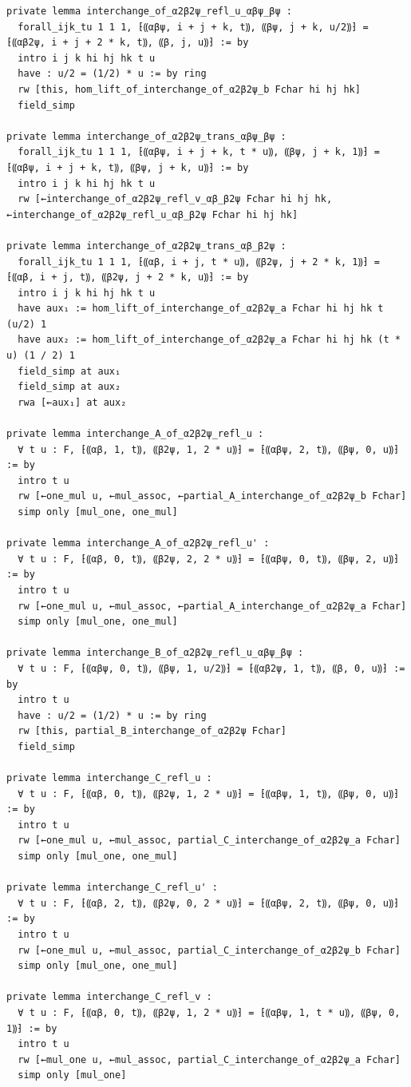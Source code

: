 \begin{Verbatim}
private lemma interchange_of_α2β2ψ_refl_u_αβψ_βψ :
  forall_ijk_tu 1 1 1, ⁅⸨αβψ, i + j + k, t⸩, ⸨βψ, j + k, u/2⸩⁆ = ⁅⸨αβ2ψ, i + j + 2 * k, t⸩, ⸨β, j, u⸩⁆ := by
  intro i j k hi hj hk t u
  have : u/2 = (1/2) * u := by ring
  rw [this, hom_lift_of_interchange_of_α2β2ψ_b Fchar hi hj hk]
  field_simp

private lemma interchange_of_α2β2ψ_trans_αβψ_βψ :
  forall_ijk_tu 1 1 1, ⁅⸨αβψ, i + j + k, t * u⸩, ⸨βψ, j + k, 1⸩⁆ = ⁅⸨αβψ, i + j + k, t⸩, ⸨βψ, j + k, u⸩⁆ := by
  intro i j k hi hj hk t u
  rw [←interchange_of_α2β2ψ_refl_v_αβ_β2ψ Fchar hi hj hk, ←interchange_of_α2β2ψ_refl_u_αβ_β2ψ Fchar hi hj hk]

private lemma interchange_of_α2β2ψ_trans_αβ_β2ψ :
  forall_ijk_tu 1 1 1, ⁅⸨αβ, i + j, t * u⸩, ⸨β2ψ, j + 2 * k, 1⸩⁆ = ⁅⸨αβ, i + j, t⸩, ⸨β2ψ, j + 2 * k, u⸩⁆ := by
  intro i j k hi hj hk t u
  have aux₁ := hom_lift_of_interchange_of_α2β2ψ_a Fchar hi hj hk t (u/2) 1
  have aux₂ := hom_lift_of_interchange_of_α2β2ψ_a Fchar hi hj hk (t * u) (1 / 2) 1
  field_simp at aux₁
  field_simp at aux₂
  rwa [←aux₁] at aux₂

private lemma interchange_A_of_α2β2ψ_refl_u :
  ∀ t u : F, ⁅⸨αβ, 1, t⸩, ⸨β2ψ, 1, 2 * u⸩⁆ = ⁅⸨αβψ, 2, t⸩, ⸨βψ, 0, u⸩⁆ := by
  intro t u
  rw [←one_mul u, ←mul_assoc, ←partial_A_interchange_of_α2β2ψ_b Fchar]
  simp only [mul_one, one_mul]

private lemma interchange_A_of_α2β2ψ_refl_u' :
  ∀ t u : F, ⁅⸨αβ, 0, t⸩, ⸨β2ψ, 2, 2 * u⸩⁆ = ⁅⸨αβψ, 0, t⸩, ⸨βψ, 2, u⸩⁆ := by
  intro t u
  rw [←one_mul u, ←mul_assoc, ←partial_A_interchange_of_α2β2ψ_a Fchar]
  simp only [mul_one, one_mul]

private lemma interchange_B_of_α2β2ψ_refl_u_αβψ_βψ :
  ∀ t u : F, ⁅⸨αβψ, 0, t⸩, ⸨βψ, 1, u/2⸩⁆ = ⁅⸨αβ2ψ, 1, t⸩, ⸨β, 0, u⸩⁆ := by
  intro t u
  have : u/2 = (1/2) * u := by ring
  rw [this, partial_B_interchange_of_α2β2ψ Fchar]
  field_simp

private lemma interchange_C_refl_u :
  ∀ t u : F, ⁅⸨αβ, 0, t⸩, ⸨β2ψ, 1, 2 * u⸩⁆ = ⁅⸨αβψ, 1, t⸩, ⸨βψ, 0, u⸩⁆ := by
  intro t u
  rw [←one_mul u, ←mul_assoc, partial_C_interchange_of_α2β2ψ_a Fchar]
  simp only [mul_one, one_mul]

private lemma interchange_C_refl_u' :
  ∀ t u : F, ⁅⸨αβ, 2, t⸩, ⸨β2ψ, 0, 2 * u⸩⁆ = ⁅⸨αβψ, 2, t⸩, ⸨βψ, 0, u⸩⁆ := by
  intro t u
  rw [←one_mul u, ←mul_assoc, partial_C_interchange_of_α2β2ψ_b Fchar]
  simp only [mul_one, one_mul]

private lemma interchange_C_refl_v :
  ∀ t u : F, ⁅⸨αβ, 0, t⸩, ⸨β2ψ, 1, 2 * u⸩⁆ = ⁅⸨αβψ, 1, t * u⸩, ⸨βψ, 0, 1⸩⁆ := by
  intro t u
  rw [←mul_one u, ←mul_assoc, partial_C_interchange_of_α2β2ψ_a Fchar]
  simp only [mul_one]


\end{Verbatim}
